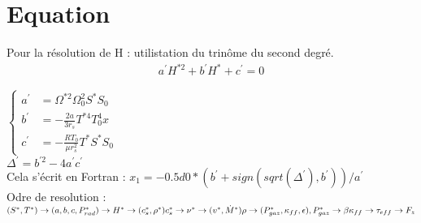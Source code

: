 \section{Equation}
Pour la résolution de H : utilistation du trinôme du second degré.
\begin{eqnarray}
  a^{\prime} H^{* 2}+b^{\prime}H^{*}+c^{\prime}=0
  \end{eqnarray}

  $\begin{cases}  
    a^{\prime} &= \Omega^{*2} \Omega_{0}^{2} S^{*} S_{0}\\
      b^{\prime} &= - \frac{2 a}{3 r_{s}} T^{*4} T_{0}^{4} x \\
        c^{\prime}&=-\frac{RT_{0}}{\mu r_{s}^{2}} T^{*} S^{*} S_{0}
        \end{cases}$\\

        $\Delta^{\prime} = b^{\prime 2} - 4a^{\prime}c^{\prime}$\\

        Cela s'écrit en Fortran : $x_1 = -0.5d0 * (b^{\prime} + sign(sqrt(\Delta^{\prime}),b^{\prime}))/a^{\prime}$\\

        Odre de resolution : \\


        \noindent $(S^{*},T^{*}) \rightarrow (a, b, c, P_{rad}^{*}) \rightarrow H^{*}
        \rightarrow (c_{s}^{*}, \rho^{*}) \\
        c_{s}^{*} \rightarrow \nu^{*} \rightarrow (v^{*}, \dot{M}^{*}) \\
        \rho \rightarrow (P_{gaz}^{*}, \kappa_{ff}, \epsilon) , \\
        P_{gaz}^{*} \rightarrow \beta \\
        \kappa_{ff} \rightarrow \tau_{eff} \rightarrow F_{z} $

